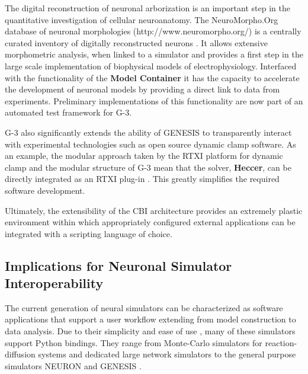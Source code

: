 \documentclass[10pt]{article}
\begin{document}
The digital reconstruction of neuronal arborization is an important step in the
quantitative investigation of cellular neuroanatomy.  The NeuroMorpho.Org database of neuronal morphologies
(http://www.neuromorpho.org/) is a centrally curated inventory of
digitally reconstructed neurons \cite{ascoli06:_mobil}.  It allows
extensive morphometric analysis, when linked to a simulator and provides a first step in the large scale
implementation of biophysical models of electrophysiology.  Interfaced with the functionality of the {\bf Model Container} it has the capacity to
accelerate the development of neuronal models by providing a direct
link to data from experiments.  Preliminary implementations of this
functionality are now part of an automated test framework for G-3.

G-3 also significantly extends the ability of GENESIS to transparently
interact with experimental technologies such as open source dynamic
clamp software.  As an example, the modular approach taken by the RTXI
platform for dynamic
clamp \cite{bettencourt08:_effec_imper_dynam_clamp, dorval01:_real}
and the modular structure of G-3 mean that the solver, {\bf Heccer},
can be directly integrated as an RTXI
plug-in \cite{cornelis10:_realt_rtxi_genes}.  This greatly simplifies
the required software development.

Ultimately, the extensibility of the CBI 
architecture provides an extremely plastic environment within which
appropriately configured external applications can be integrated with a scripting language of
choice.

\subsection*{Implications for Neuronal Simulator Interoperability}

The current generation of neural simulators can be characterized as
software applications that support a user workflow extending from
model construction to data analysis.  Due to their simplicity \cite{goodman08:_brian} and ease of use \cite{pecevski09:_pcsim}, many of these simulators support Python bindings. 
They range from Monte-Carlo
simulators for reaction-diffusion systems \cite{wils09:_steps} and
dedicated large network simulators \cite{eppler08:_pynes} to the
general purpose simulators NEURON and GENESIS \cite{hines09:_neuron_python, bower98:_book_genes}.
\end{document}
